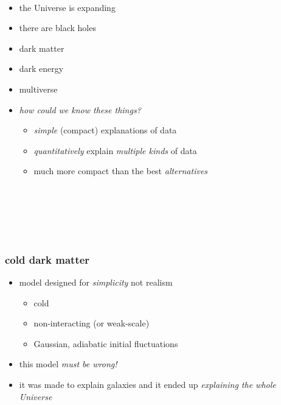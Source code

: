 \documentclass{beamer}
\begin{document}
\whiteonblack

{\begin{frame}[plain]~\end{frame}}

\begin{frame}
\begin{itemize}
\item the Universe is expanding
\item there are black holes
\item dark matter
\item dark energy
\item multiverse
\item \emph{how could we know these things?}
  \begin{itemize}
  \item \emph{simple} (compact) explanations of data
  \item \emph{quantitatively} explain \emph{multiple kinds} of data
  \item much more compact than the best \emph{alternatives}
  \end{itemize}
\end{itemize}
\end{frame}

{\begin{frame}[plain]~\end{frame}}

{\begin{frame}[plain]~\end{frame}}

{\begin{frame}[plain]~\end{frame}}

\begin{frame}
\frametitle{cold dark matter}
\begin{itemize}
\item model designed for \emph{simplicity} not realism
  \begin{itemize}
  \item cold
  \item non-interacting (or weak-scale)
  \item Gaussian, adiabatic initial fluctuations
  \end{itemize}
\item this model \emph{must be wrong!}
\item it was made to explain galaxies and it ended up \emph{explaining the whole Universe}
\end{itemize}
\end{frame}
\end{document}
